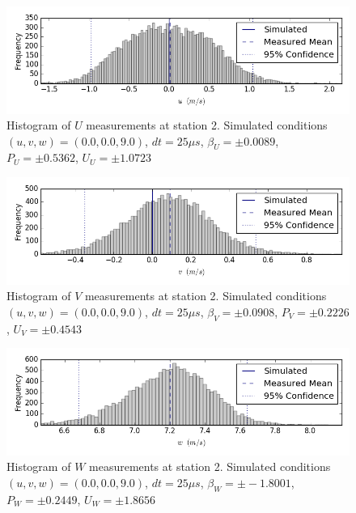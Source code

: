 \begin{figure}[H]
\centering
\includegraphics[width=6in]{figs/Ely_May28th02003/uncertainty_Ely_May28th02003_U}
\caption{Histogram of $U$ measurements at station 2. Simulated conditions $(u,v,w)=(0.0, 0.0, 9.0)$, $dt=25 \mu s$, $\beta_U=\pm 0.0089$, $P_U=\pm 0.5362$, $U_U=\pm 1.0723$}
\label{fig:uncertainty_Ely_May28th02003_U}
\end{figure}


\begin{figure}[H]
\centering
\includegraphics[width=6in]{figs/Ely_May28th02003/uncertainty_Ely_May28th02003_V}
\caption{Histogram of $V$ measurements at station 2. Simulated conditions $(u,v,w)=(0.0, 0.0, 9.0)$, $dt=25 \mu s$, $\beta_V=\pm 0.0908$, $P_V=\pm 0.2226$, $U_V=\pm 0.4543$}
\label{fig:uncertainty_Ely_May28th02003_V}
\end{figure}


\begin{figure}[H]
\centering
\includegraphics[width=6in]{figs/Ely_May28th02003/uncertainty_Ely_May28th02003_W}
\caption{Histogram of $W$ measurements at station 2. Simulated conditions $(u,v,w)=(0.0, 0.0, 9.0)$, $dt=25 \mu s$, $\beta_W=\pm -1.8001$, $P_W=\pm 0.2449$, $U_W=\pm 1.8656$}
\label{fig:uncertainty_Ely_May28th02003_W}
\end{figure}


